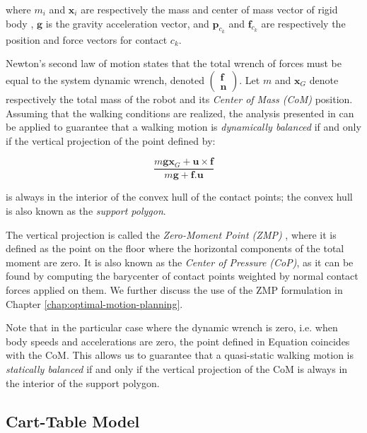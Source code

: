 where $m_i$ and $\mathbf{x}_i$ are respectively the mass and center of
mass vector of rigid body , $\mathbf{g}$ is the gravity
acceleration vector, and $\mathbf{p}_{c_k}$ and $\mathbf{f}_{c_k}$ are
respectively the position and force vectors for contact $c_k$.

Newton's second law of motion states that the total wrench of forces
must be equal to the system dynamic wrench, denoted
$\left(\begin{matrix}\mathbf{f}\\\mathbf{n}\end{matrix}\right)$. Let
$m$ and $\mathbf{x}_G$ denote respectively the total mass of the robot
and its \emph{Center of Mass (CoM)} position. Assuming that the
walking conditions are realized, the analysis presented in
\cite{wieber2002} can be applied to guarantee that a walking motion is
\emph{dynamically balanced} if and only if the vertical projection of
the point defined by:

\begin{equation}
\label{eq:chap1-dynamic-balance}
  \frac{m\mathbf{g}\mathbf{x}_G +
    \mathbf{u}\times\mathbf{f}}{m\mathbf{g} + \mathbf{f}.\mathbf{u}}
\end{equation}

is always in the interior of the convex hull of the contact points;
the convex hull is also known as the \emph{support polygon}.

The vertical projection is called the \emph{Zero-Moment Point (ZMP)}
\cite{vukobratovic1969contribution}, where it is defined as the point
on the floor where the horizontal components of the total moment are
zero. It is also known as the \emph{Center of Pressure (CoP)}, as it
can be found by computing the barycenter of contact points weighted by
normal contact forces applied on them. We further discuss the use of
the ZMP formulation in Chapter \ref{chap:optimal-motion-planning}.

Note that in the particular case where the dynamic wrench is zero,
i.e. when body speeds and accelerations are zero, the point defined in
Equation  coincides with the CoM. This
allows us to guarantee that a quasi-static walking motion is
\emph{statically balanced} if and only if the vertical projection of
the CoM is always in the interior of the support polygon.

\subsection{Cart-Table Model}
\label{subsec:chap1-cart-table}

